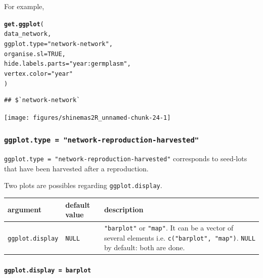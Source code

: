 \documentclass{article}\usepackage[]{graphicx}\usepackage[]{color}
\makeatletter
\newcommand{\hlnum}[1]{\textcolor[rgb]{0.686,0.059,0.569}{#1}}%
\newcommand{\hlstr}[1]{\textcolor[rgb]{0.192,0.494,0.8}{#1}}%
\newcommand{\hlstd}[1]{\textcolor[rgb]{0.345,0.345,0.345}{#1}}%
\newcommand{\hlkwc}[1]{\textcolor[rgb]{0.333,0.667,0.333}{#1}}%
\newcommand{\hlkwd}[1]{\textcolor[rgb]{0.737,0.353,0.396}{\textbf{#1}}}%
\newenvironment{kframe}{%
 \def\at@end@of@kframe{}%
 \ifinner\ifhmode%
  \def\at@end@of@kframe{\end{minipage}}%
  \begin{minipage}{\columnwidth}%
 \fi\fi%
 \def\FrameCommand##1{\hskip\@totalleftmargin \hskip-\fboxsep
 \colorbox{shadecolor}{##1}\hskip-\fboxsep
     \hskip-\linewidth \hskip-\@totalleftmargin \hskip\columnwidth}%
 \MakeFramed {\advance\hsize-\width
   \@totalleftmargin\z@ \linewidth\hsize
   \@setminipage}}%
 {\par\unskip\endMakeFramed%
 \at@end@of@kframe}
\newenvironment{knitrout}{}{} %
\makeatother
\begin{document}
For example,

\begin{knitrout}
\color{fgcolor}\begin{kframe}
\begin{alltt}
\hlkwd{get.ggplot}\hlstd{(}
        \hlstd{data_network,}
        \hlkwc{ggplot.type} \hlstd{=} \hlstr{"network-network"}\hlstd{,}
        \hlkwc{organise.sl} \hlstd{=} \hlnum{TRUE}\hlstd{,}
        \hlkwc{hide.labels.parts} \hlstd{=} \hlstr{"year:germplasm"}\hlstd{,}
        \hlkwc{vertex.color} \hlstd{=} \hlstr{"year"}
        \hlstd{)}
\end{alltt}
\begin{verbatim}
## $`network-network`
\end{verbatim}
\end{kframe}


{\centering \texttt{[image: figures/shinemas2R\_unnamed-chunk-24-1]} 

}



\end{knitrout}

\subsubsection{\texttt{ggplot.type = "network-reproduction-harvested"}}


\texttt{ggplot.type = "network-reproduction-harvested"} corresponds to seed-lots that have been harvested after a reproduction.


Two plots are possibles regarding \texttt{ggplot.display}.

\begin{center}
\begin{tabular}{ p{} p{} p{} }
\hline
argument & default value & description \\
\hline
\texttt{ggplot.display} & \texttt{NULL} & \texttt{"barplot"} or  \texttt{"map"}.
It can be a vector of several elements i.e. \texttt{c("barplot", "map")}. 
\texttt{NULL} by default: both are done. \\
\hline
\end{tabular}
\end{center}


\paragraph{\texttt{ggplot.display = barplot}}
\end{document}
